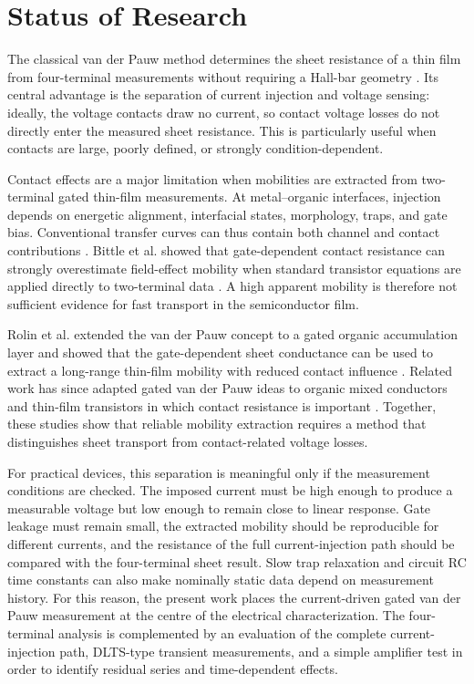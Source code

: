 \section{Status of Research}
\label{sec:status_of_research}

The classical van der Pauw method determines the sheet resistance of a thin film
from four-terminal measurements without requiring a Hall-bar geometry
\cite{VanDerPauw1958}. Its central advantage is the separation of current
injection and voltage sensing: ideally, the voltage contacts draw no current, so
contact voltage losses do not directly enter the measured sheet resistance. This
is particularly useful when contacts are large, poorly defined, or strongly
condition-dependent.

Contact effects are a major limitation when mobilities are extracted from
two-terminal gated thin-film measurements. At
metal--organic interfaces, injection depends on energetic alignment, interfacial
states, morphology, traps, and gate bias. Conventional transfer curves can thus
contain both channel and contact contributions \cite{Natali2012ChargeInjection}.
Bittle et al. showed that gate-dependent contact resistance can strongly
overestimate field-effect mobility when standard transistor equations are applied
directly to two-terminal data \cite{Bittle2016MobilityOverestimation}. A high apparent mobility is therefore not sufficient evidence for fast
transport in the semiconductor film.

Rolin et al. extended the van der Pauw concept to a gated organic accumulation
layer and showed that the gate-dependent sheet conductance can be used to extract
a long-range thin-film mobility with reduced contact influence
\cite{Rolin2017GVDP}. Related work has since adapted gated van der Pauw ideas to
organic mixed conductors and thin-film transistors in which contact resistance is
important \cite{Bonafe2021EgVDP,Lee2024GVDPIGZO,Lee2025VoltageDrivenGVDP}.
Together, these studies show that reliable mobility extraction requires a method
that distinguishes sheet transport from contact-related voltage losses.

For practical devices, this separation is meaningful only if the measurement
conditions are checked. The imposed current must be high enough to produce a
measurable voltage but low enough to remain close to linear response. Gate
leakage must remain small, the extracted mobility should be reproducible for
different currents, and the resistance of the full current-injection path should
be compared with the four-terminal sheet result. Slow trap relaxation and circuit
RC time constants can also make nominally static data depend on measurement
history. For this reason, the present work places the current-driven gated van der Pauw
measurement at the centre of the electrical characterization.
The four-terminal analysis is complemented by an
evaluation of the complete current-injection path, DLTS-type transient measurements, and a simple amplifier test in order to identify residual series and time-dependent effects.
